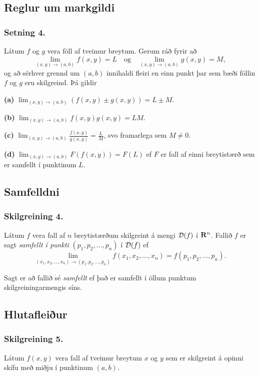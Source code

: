  




\subsection{Reglur um markgildi}
 \subsubsection{Setning 4.}
  Látum $f$ og $g$ vera föll af tveimur breytum.  Gerum ráð  fyrir að 
$$\lim_{(x,y)\rightarrow (a,b)}f(x,y)=L\quad\mbox{og}\quad
\lim_{(x,y)\rightarrow (a,b)}g(x,y)=M,$$
og að sérhver grennd um $(a,b)$ innihaldi fleiri en einn punkt þar sem bæði föllin $f$ og $g$ eru skilgreind. Þá gildir

{\bf (a)}  $\lim_{(x,y)\rightarrow (a,b)}(f(x,y)\pm g(x,y))=L\pm M$.

{\bf (b)}  $\lim_{(x,y)\rightarrow (a,b)}f(x,y) g(x,y)=LM$.

{\bf (c)}  $\lim_{(x,y)\rightarrow (a,b)}\frac{f(x,y)}{g(x,y)}=
\frac{L}{M}$, svo framarlega sem $M\neq 0$.

{\bf (d)}  $\lim_{(x,y)\rightarrow (a,b)}F(f(x,y))=F(L)$ ef $F$ er fall af einni breytistærð sem er samfellt í punktinum $L$.
 
 




\subsection{Samfelldni}
 \subsubsection{Skilgreining 4.}
   Látum $f$ vera fall af $n$ breytistærðum skilgreint á mengi ${\cal D}(f)$ í $\mbox{${\bf R}^n$}$.  Fallið $f$ er sagt {\em samfellt í punkti} $ (p_1,p_2,\ldots,p_n)$ í ${\cal D}(f)$  ef 
$$\lim_{(x_1,x_2,\ldots,x_n)\rightarrow (p_1,p_2,\ldots,p_n)}
f(x_1,x_2,\ldots,x_n)=f(p_1,p_2,\ldots,p_n).$$

Sagt er að fallið sé {\em samfellt} ef það er samfellt í öllum punktum skilgreiningarmengis síns.

 


\subsection{Hlutafleiður}
\subsubsection{Skilgreining 5.}
 Látum $f(x,y)$ vera fall af tveimur breytum $x$ og $y$ sem er skilgreint á opinni skífu með miðju í punktinum $(a,b)$. 
 
